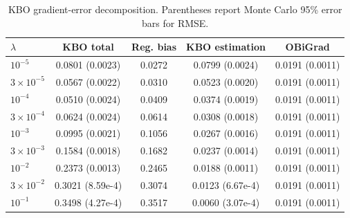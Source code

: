 \begin{table}[t]
\centering
\small
\setlength{\tabcolsep}{5pt}
\caption{KBO gradient-error decomposition. Parentheses report Monte Carlo 95\% error bars for RMSE.}
\label{tab:generated-iv-kbo-gradient}
\begin{tabular}{lcccc}
\toprule
$\lambda$ & KBO total & Reg. bias & KBO estimation & OBiGrad \\
\midrule
$10^{-5}$ & 0.0801 (0.0023) & 0.0272 & 0.0799 (0.0024) & 0.0191 (0.0011) \\
$3\times 10^{-5}$ & 0.0567 (0.0022) & 0.0310 & 0.0523 (0.0020) & 0.0191 (0.0011) \\
$10^{-4}$ & 0.0510 (0.0024) & 0.0409 & 0.0374 (0.0019) & 0.0191 (0.0011) \\
$3\times 10^{-4}$ & 0.0624 (0.0024) & 0.0614 & 0.0308 (0.0018) & 0.0191 (0.0011) \\
$10^{-3}$ & 0.0995 (0.0021) & 0.1056 & 0.0267 (0.0016) & 0.0191 (0.0011) \\
$3\times 10^{-3}$ & 0.1584 (0.0018) & 0.1682 & 0.0237 (0.0014) & 0.0191 (0.0011) \\
$10^{-2}$ & 0.2373 (0.0013) & 0.2465 & 0.0188 (0.0011) & 0.0191 (0.0011) \\
$3\times 10^{-2}$ & 0.3021 (8.59e-4) & 0.3074 & 0.0123 (6.67e-4) & 0.0191 (0.0011) \\
$10^{-1}$ & 0.3498 (4.27e-4) & 0.3517 & 0.0060 (3.07e-4) & 0.0191 (0.0011) \\
\bottomrule
\end{tabular}
\end{table}
